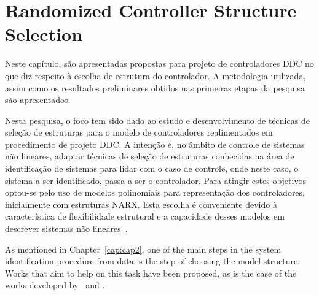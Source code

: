 
\chapter{Randomized Controller Structure Selection}\label{cap:CCS}
\vspace{-1cm}

%
%


Neste capítulo, são apresentadas propostas para projeto de controladores DDC no que diz respeito à escolha de estrutura do controlador. A metodologia utilizada, assim como os resultados preliminares obtidos nas primeiras etapas da pesquisa são apresentados.

Nesta pesquisa, o foco tem sido dado ao estudo e desenvolvimento de técnicas de seleção de estruturas para o modelo de controladores realimentados em procedimento de projeto DDC\@.
A intenção é, no âmbito de controle de sistemas não lineares, adaptar técnicas de seleção de estruturas conhecidas na área de identificação de sistemas para lidar com o caso de controle, onde neste caso, o sistema a ser identificado, passa a ser o controlador. Para atingir estes objetivos optou-se pelo uso de modelos polinomiais para representação dos controladores, inicialmente com estruturas NARX\@. Esta escolha é conveniente devido à característica de flexibilidade estrutural e a capacidade desses modelos em descrever sistemas não lineares~\citep{pearson1999,martins2013}.
%

As mentioned in Chapter~\ref{cap:cap2}, one of the main steps in the system identification procedure from data is the step of choosing the model structure. Works that aim to help on this task have been proposed, as is the case of the works developed by~\cite{baldacchino2012,baldacchino2013} and \cite{falsone2014,falsone2015}.

